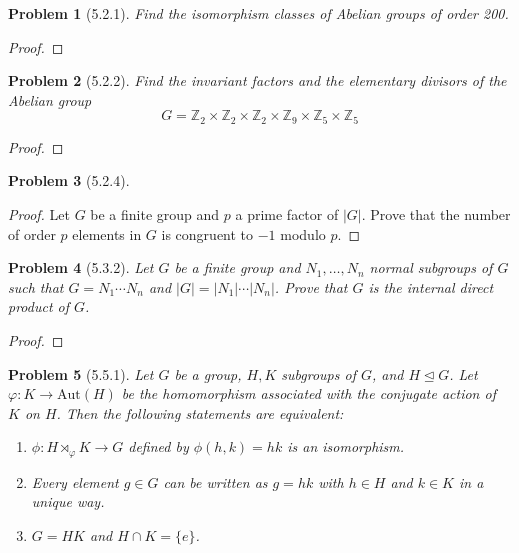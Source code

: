 \documentclass[10pt]{article}
\newcommand{\sk}{\vskip 10mm}
\newcommand{\bb}[1]{\mathbb{#1}}
\theoremstyle{plain}
\newtheorem{problem}{Problem}
\theoremstyle{remark}
\begin{document}
\begin{problem}[5.2.1]
  Find the isomorphism classes of Abelian groups of order 200.
\end{problem}

\begin{proof}
  
\end{proof}

\sk

\begin{problem}[5.2.2]
  Find the invariant factors and the elementary divisors of the Abelian
  group
  \[ G=\bb{Z}_2\times\bb{Z}_2\times\bb{Z}_2\times\bb{Z}_9\times\bb{Z}_5\times\bb{Z}_5\]
\end{problem}

\begin{proof}
  
\end{proof}

\sk

\begin{problem}[5.2.4]
  
\end{problem}

\begin{proof}
  Let $G$ be a finite group and $p$ a prime factor of $|G|$. Prove that the
  number of order $p$ elements in $G$ is congruent to $-1$ modulo $p$.
\end{proof}

\sk

\begin{problem}[5.3.2]
  Let $G$ be a finite group and $N_1,\ldots, N_n$ normal subgroups of $G$ such
  that $G=N_1\cdots N_n$ and $|G|=|N_1|\cdots|N_n|$. Prove that $G$ is the internal direct
  product of $G$.
\end{problem}

\begin{proof}
  
\end{proof}

\sk

\begin{problem}[5.5.1]
  Let $G$ be a group, $H,K$ subgroups of $G$, and $H\trianglelefteq G$. Let
  $\varphi:K\rightarrow \text{Aut}(H)$ be the homomorphism associated with the conjugate
  action of $K$ on $H$. Then the following statements are equivalent:
  \begin{enumerate}
  \item $\phi:H\rtimes_\varphi K\rightarrow G$ defined by $\phi(h,k)=hk$ is an isomorphism.
  \item Every element $g\in G$ can be written as $g=hk$ with $h\in H$ and $k\in K$
    in a unique way.
  \item $G=HK$ and $H\cap K=\{e\}$.
  \end{enumerate}
\end{problem}
\end{document}
